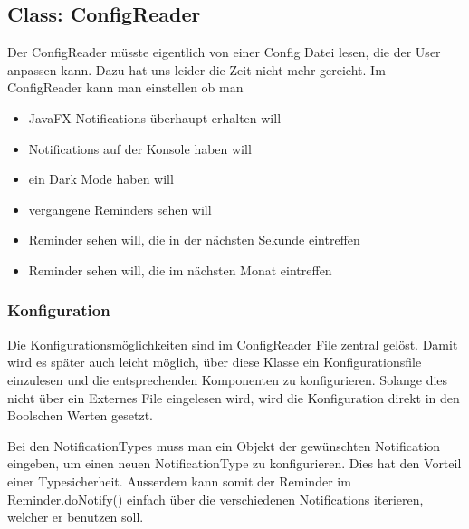 \subsection{Class: ConfigReader}
Der ConfigReader müsste eigentlich von einer Config Datei lesen, die der User anpassen kann. Dazu hat uns leider die Zeit nicht mehr gereicht.
Im ConfigReader kann man einstellen ob man
\begin{itemize}
  \item JavaFX Notifications überhaupt erhalten will
  \item Notifications auf der Konsole haben will
  \item ein Dark Mode haben will
  \item vergangene Reminders sehen will
  \item Reminder sehen will, die in der nächsten Sekunde eintreffen
  \item Reminder sehen will, die im nächsten Monat eintreffen
\end{itemize}

\subsubsection{Konfiguration}
Die Konfigurationsmöglichkeiten sind im ConfigReader File zentral gelöst. Damit wird es später auch leicht möglich, über diese Klasse ein Konfigurationsfile einzulesen und
die entsprechenden Komponenten zu konfigurieren. Solange dies nicht über ein Externes File eingelesen wird, wird die Konfiguration direkt in den Boolschen Werten gesetzt.

Bei den NotificationTypes muss man ein Objekt der gewünschten Notification eingeben, um einen neuen NotificationType zu konfigurieren. Dies hat den Vorteil einer Typesicherheit.
Ausserdem kann somit der Reminder im Reminder.doNotify() einfach über die verschiedenen Notifications iterieren, welcher er benutzen soll.
